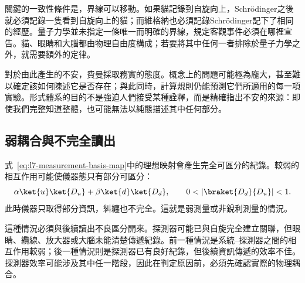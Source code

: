 關鍵的一致性條件是，界線可以移動。如果貓記錄到自旋向上，Schr\"odinger之後就必須記錄一隻看到自旋向上的貓；而維格納也必須記錄Schr\"odinger記下了相同的經歷。量子力學並未指定一條唯一而明確的界線，規定客觀事件必須在哪裡宣告。貓、眼睛和大腦都由物理自由度構成；若要將其中任何一者排除於量子力學之外，就需要額外的定律。

對於由此產生的不安，費曼採取務實的態度。概念上的問題可能極為龐大，甚至難以確定該如何陳述它是否存在；與此同時，計算規則仍能預測它們所適用的每一項實驗。形式體系的目的不是強迫人們接受某種詮釋，而是精確指出不安的來源：即使我們完整知道整體，也可能無法以純態描述其中任何部分。

\begin{classroomqa}
\end{classroomqa}

\begin{classroomqa}
\end{classroomqa}

\subsection{弱耦合與不完全讀出}

式~\eqref{eq:l7-measurement-basis-map}中的理想映射會產生完全可區分的紀錄。較弱的相互作用可能使儀器態只有部分可區分：
\begin{equation}
\alpha\ket{u}\ket{D_u}
+\beta\ket{d}\ket{D_d},
\qquad
0<|\braket{D_d}{D_u}|<1.
\label{eq:l7-weak-measurement}
\end{equation}
此時儀器只取得部分資訊，糾纏也不完全。這就是弱測量或非銳利測量的情況。

這種情況必須與後續讀出不良區分開來。探測器可能已與自旋完全建立關聯，但眼睛、纜線、放大器或大腦未能清楚傳遞紀錄。前一種情況是系統--探測器之間的相互作用較弱；後一種情況則是探測器已有良好紀錄，但後續資訊傳遞的效率不佳。探測器效率可能涉及其中任一階段，因此在判定原因前，必須先確認實際的物理耦合。

\begin{classroomqa}
\end{classroomqa}

